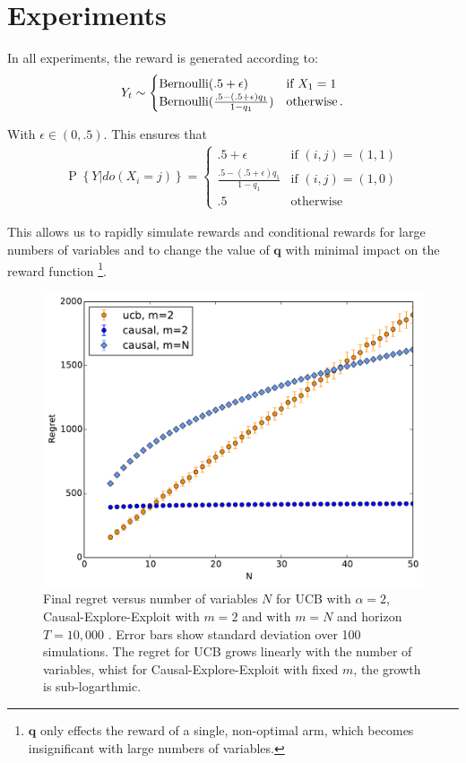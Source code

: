 \documentclass{article}
\newcommand{\eq}[1]{\begin{align*}#1\end{align*}}
\renewcommand{\P}[1]{\operatorname{P}\left\{#1\right\}}
\theoremstyle{plain}
\theoremstyle{definition}
\begin{document}
\section{Experiments}
In all experiments, the reward is generated according to:
\eq{
Y_t \sim \begin{cases}
\bernoulli(.5+\epsilon) & \text{if } X_1 = 1 \\
\bernoulli(\frac{.5-(.5+\epsilon)q_1}{1-q_1}) & \text{otherwise}\,.
\end{cases}
}

With $\epsilon \in (0,.5)$. This ensures that 
\eq {
\P{Y|do(X_i = j)} = \begin{cases}
.5+\epsilon & \text{if } (i,j)=(1,1) \\
\frac{.5-(.5+\epsilon)q_1}{1-q_1} & \text{if } (i,j) = (1,0) \\
.5 & \text{otherwise}
\end{cases}
}

This allows us to rapidly simulate rewards and conditional rewards for large numbers of variables and to change the value of $\boldsymbol{q}$ with minimal impact on the reward function \footnote{$\boldsymbol{q}$ only effects the reward of a single, non-optimal arm, which becomes insignificant with large numbers of variables.}. 

\begin{figure}
\caption{Final regret versus number of variables $N$ for UCB with $\alpha = 2$, Causal-Explore-Exploit with $m=2$ and with $m=N$ and horizon $T = 10,000$ . Error bars show standard deviation over 100 simulations. The regret for UCB grows linearly with the number of variables, whist for Causal-Explore-Exploit with fixed $m$, the growth is sub-logarthmic.  }
\label{fig:known_q_r_vs_N}
\centering
\includegraphics[width=.5\textwidth]{exp_regret_vs_N_T10000_sims100_20151229_113550.pdf}
\end{figure}
\end{document}
